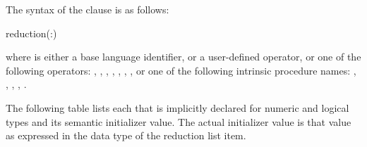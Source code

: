 \fortranspecificstart
The syntax of the  clause is as follows:

\begin{boxedcode}
reduction(:)
\end{boxedcode}

where  is either a base language identifier, or a user-defined operator, 
or one of the following operators: 
\code{+}, 
\code{-}, 
\code{*}, 
, 
, 
, 
, 
 or one of the following intrinsic procedure names: 
, 
, 
, 
, 
. 

The following table lists each  that is implicitly declared for numeric 
and logical types and its semantic initializer value. The actual initializer value is that 
value as expressed in the data type of the reduction list item.

